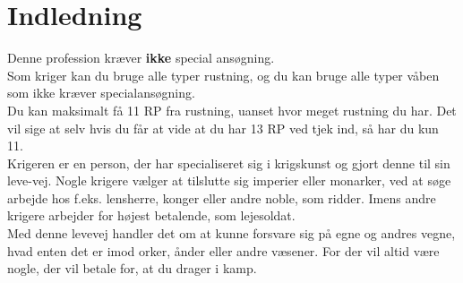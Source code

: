 \chapter{Indledning}
Denne profession kræver \textbf{ikke} special ansøgning.\\
Som kriger kan du bruge alle typer rustning, og du kan bruge alle typer våben som ikke kræver specialansøgning.\\
Du kan maksimalt få 11 RP fra rustning, uanset hvor meget rustning du har. Det vil sige at selv hvis du får at vide at du har 13 RP ved tjek ind, så har du kun 11.\\

Krigeren er en person, der har specialiseret sig i krigskunst og gjort denne til sin leve-vej. Nogle krigere vælger at tilslutte sig imperier eller monarker, ved at søge arbejde hos f.eks. lensherre, konger eller andre noble, som ridder. Imens andre krigere arbejder for højest betalende, som lejesoldat.\\
Med denne levevej handler det om at kunne forsvare sig på egne og andres vegne, hvad enten det er imod orker, ånder eller andre væsener. For der vil altid være nogle, der vil betale for, at du drager i kamp.\\
